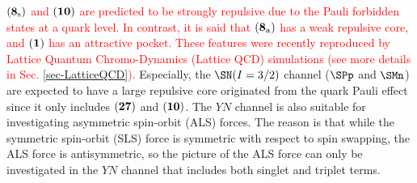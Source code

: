 \textcolor{red}{ ${\bf (8_{\rm{s}})}$ and ${\bf (10)}$ are predicted to be strongly repulsive due to the Pauli forbidden states at a quark level. In contrast, it is said that ${\bf (8_{\rm{a}})}$ has a weak repulsive core, and ${\bf (1)}$ has an attractive pocket. These features were recently reproduced by Lattice Quantum Chromo-Dynamics (Lattice QCD) simulations \cite{QCD-2019} (see more details in Sec. \ref{sec-LatticeQCD}). } Especially, the $\SN(I=3/2)$ channel ($\SPp$ and $\SMn$) are expected to have a large repulsive core originated from the quark Pauli effect since it only includes ${\bf (27)}$ and ${\bf (10)}$. The $YN$ channel is also suitable for investigating asymmetric spin-orbit (ALS) forces. The reason is that while the symmetric spin-orbit (SLS) force is symmetric with respect to spin swapping, the ALS force is antisymmetric, so the picture of the ALS force can only be investigated in the $YN$ channel that includes both singlet and triplet terms. 


